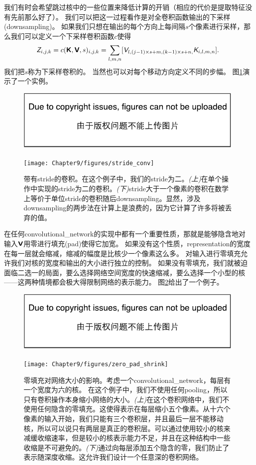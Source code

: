 我们有时会希望跳过核中的一些位置来降低计算的开销（相应的代价是提取特征没有先前那么好了）。
我们可以把这一过程看作是对全卷积函数输出的下采样(downsampling)。
如果我们只想在输出的每个方向上每间隔$s$个像素进行采样，那么我们可以定义一个下采样卷积函数$c$使得
\begin{equation}
\textit{\textsf{Z}}_{i,j,k} = c(\textsf{\textbf{K}}, \textsf{\textbf{V}}, s)_{i,j,k} = \sum_{l,m,n} [\textit{\textsf{V}}_{l,(j-1)\times s+m, (k-1)\times s +n,}
 \textit{\textsf{K}}_{i,l,m,n}].
 \label{eq:9.8}
\end{equation}
我们把$s$称为下采样卷积的。
当然也可以对每个移动方向定义不同的步幅。
图\ref{fig:chap9_stride_conv}演示了一个实例。
\begin{figure}[!htb]
\ifOpenSource
\centerline{\includegraphics{figure.pdf}}
\else
\centerline{\texttt{[image: Chapter9/figures/stride\_conv]}}
\fi
\caption{带有\gls{stride}的卷积。在这个例子中，我们的\gls{stride}为二。\emph{(上)}在单个操作中实现的\gls{stride}为二的卷积。\emph{(下)}\gls{stride}大于一个像素的卷积在数学上等价于单位\gls{stride}的卷积随后\gls{downsampling}。显然，涉及\gls{downsampling}的两步法在计算上是浪费的，因为它计算了许多将被丢弃的值。}
\label{fig:chap9_stride_conv}
\end{figure}

在任何\gls{convolutional_network}的实现中都有一个重要性质，那就是能够隐含地对输入$\textsf{\textbf{V}}$用零进行填充(pad)使得它加宽。
如果没有这个性质，\gls{representation}的宽度在每一层就会缩减，缩减的幅度是比核少一个像素这么多。
对输入进行零填充允许我们对核的宽度和输出的大小进行独立的控制。
如果没有零填充，我们就被迫面临二选一的局面，要么选择网络空间宽度的快速缩减，要么选择一个小型的核——这两种情境都会极大得限制网络的表示能力。
图\ref{fig:chap9_zero_pad_shrink}给出了一个例子。
\begin{figure}[!htb]
\ifOpenSource
\centerline{\includegraphics{figure.pdf}}
\else
\centerline{\texttt{[image: Chapter9/figures/zero\_pad\_shrink]}}
\fi
\caption{零填充对网络大小的影响。考虑一个\gls{convolutional_network}，每层有一个宽度为六的核。 在这个例子中，我们不使用任何\gls{pooling}，所以只有卷积操作本身缩小网络的大小。\emph{(上)}在这个卷积网络中，我们不使用任何隐含的零填充。这使得表示在每层缩小五个像素。从十六个像素的输入开始，我们只能有三个卷积层，并且最后一层不能移动核，所以可以说只有两层是真正的卷积层。可以通过使用较小的核来减缓收缩速率，但是较小的核表示能力不足，并且在这种结构中一些收缩是不可避免的。\emph{(下)}通过向每层添加五个隐含的零，我们防止了表示随深度收缩。这允许我们设计一个任意深的卷积网络。}
\label{fig:chap9_zero_pad_shrink}
\end{figure}

